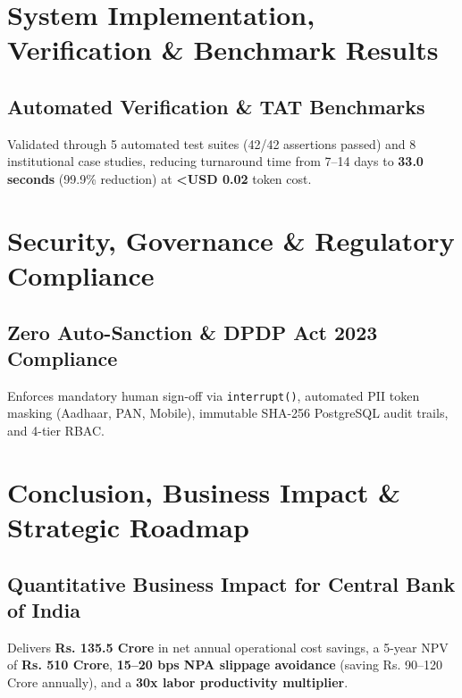 \documentclass[11pt,a4paper,oneside]{report}
\begin{document}
\chapter{System Implementation, Verification \& Benchmark Results}

\section{Automated Verification \& TAT Benchmarks}
Validated through 5 automated test suites (42/42 assertions passed) and 8 institutional case studies, reducing turnaround time from 7--14 days to \textbf{33.0 seconds} (99.9\% reduction) at \textbf{<USD 0.02} token cost.

\chapter{Security, Governance \& Regulatory Compliance}

\section{Zero Auto-Sanction \& DPDP Act 2023 Compliance}
Enforces mandatory human sign-off via \texttt{interrupt()}, automated PII token masking (Aadhaar, PAN, Mobile), immutable SHA-256 PostgreSQL audit trails, and 4-tier RBAC.

\chapter{Conclusion, Business Impact \& Strategic Roadmap}

\section{Quantitative Business Impact for Central Bank of India}
Delivers \textbf{Rs. 135.5 Crore} in net annual operational cost savings, a 5-year NPV of \textbf{Rs. 510 Crore}, \textbf{15--20 bps NPA slippage avoidance} (saving Rs. 90--120 Crore annually), and a \textbf{30x labor productivity multiplier}.
\end{document}

